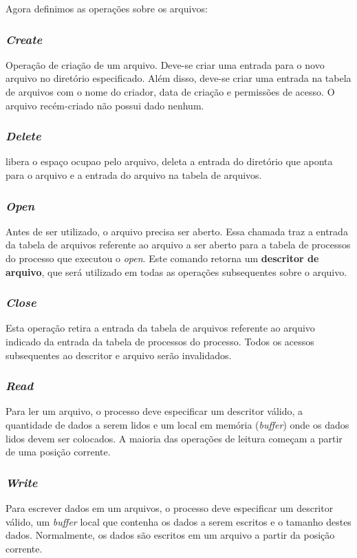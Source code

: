 Agora definimos as operações sobre os arquivos:

\subsubsection{\textit{Create}}
Operação de criação de um arquivo. Deve-se criar uma entrada para o novo arquivo no diretório especificado. Além disso, deve-se criar uma entrada na tabela de arquivos com o nome do criador, data de criação e permissões de acesso. O arquivo recém-criado não possui dado nenhum.


\subsubsection{\textit{Delete}}
libera o espaço ocupao pelo arquivo, deleta a entrada do diretório que aponta para o arquivo e a entrada do arquivo na tabela de arquivos.


\subsubsection{\textit{Open}}
Antes de ser utilizado, o arquivo precisa ser aberto. Essa chamada traz a entrada da tabela de arquivos referente ao arquivo a ser aberto para a tabela de processos do processo que executou o \textit{open}. Este comando retorna um \textbf{descritor de arquivo}, que será utilizado em todas as operações subsequentes sobre o arquivo.


\subsubsection{\textit{Close}}
Esta operação retira a entrada da tabela de arquivos referente ao arquivo indicado da entrada da tabela de processos do processo. Todos os acessos subsequentes ao descritor e arquivo serão invalidados.


\subsubsection{\textit{Read}}
Para ler um arquivo, o processo deve especificar um descritor válido, a quantidade de dados a serem lidos e um local em memória (\textit{buffer}) onde os dados lidos devem ser colocados. A maioria das operações de leitura começam a partir de uma posição corrente.

\subsubsection{\textit{Write}}
Para escrever dados em um arquivos, o processo deve especificar um descritor válido, um \textit{buffer} local que contenha os dados a serem escritos e o tamanho destes dados. Normalmente, os dados são escritos em um arquivo a partir da posição corrente.


